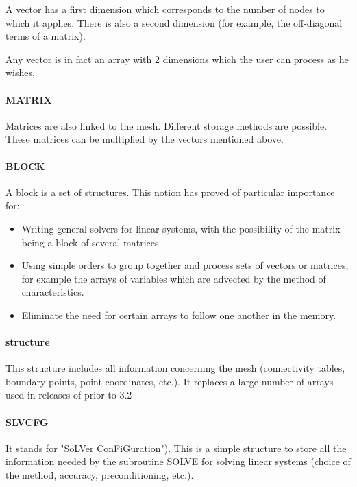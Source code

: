 A vector has a first dimension which corresponds to the number of nodes to
which it applies. There is also a second dimension (for example, the
off-diagonal terms of a matrix).

Any vector is in fact an array with 2 dimensions which the user can process as
he wishes.

\paragraph{MATRIX}

Matrices are also linked to the mesh. Different storage methods are possible.
These matrices can be multiplied by the vectors mentioned above.

\paragraph{BLOCK}

A block is a set of structures. This notion has proved of particular importance for:
\begin{itemize}
\item Writing general solvers for linear systems, with the possibility of the
  matrix being a block of several matrices.
\item Using simple orders to group together and process sets of vectors or
  matrices, for example the arrays of variables which are advected by the
  method of characteristics.
\item Eliminate the need for certain arrays to follow one another in the
  memory.
\end{itemize}

\paragraph{ structure}

This structure includes all information concerning the mesh (connectivity
tables, boundary points, point coordinates, etc.). It replaces a large number
of arrays used in releases of \bief prior to 3.2

\paragraph{SLVCFG}

It stands for "SoLVer ConFiGuration"). This is a simple structure to store all
the information needed by the subroutine SOLVE for solving linear systems
(choice of the method, accuracy, preconditioning, etc.).

